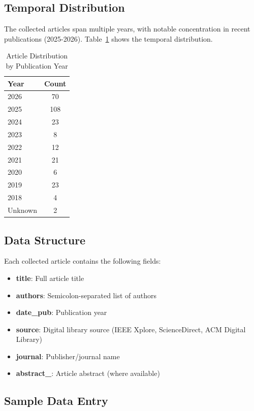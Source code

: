 \documentclass[12pt,a4paper]{article}
\begin{document}
\subsection{Temporal Distribution}

The collected articles span multiple years, with notable concentration in recent publications (2025-2026). Table~\ref{tab:years} shows the temporal distribution.

\begin{table}[H]
\centering
\caption{Article Distribution by Publication Year}
\label{tab:years}
\begin{tabular}{@{}lc@{}}
\toprule
\textbf{Year} & \textbf{Count} \\
\midrule
2026 & 70 \\
2025 & 108 \\
2024 & 23 \\
2023 & 8 \\
2022 & 12 \\
2021 & 21 \\
2020 & 6 \\
2019 & 23 \\
2018 & 4 \\
Unknown & 2 \\
\bottomrule
\end{tabular}
\end{table}

\subsection{Data Structure}

Each collected article contains the following fields:

\begin{itemize}
    \item \textbf{title}: Full article title
    \item \textbf{authors}: Semicolon-separated list of authors
    \item \textbf{date\_pub}: Publication year
    \item \textbf{source}: Digital library source (IEEE Xplore, ScienceDirect, ACM Digital Library)
    \item \textbf{journal}: Publisher/journal name
    \item \textbf{abstract\_}: Article abstract (where available)
\end{itemize}

\subsection{Sample Data Entry}
\end{document}
